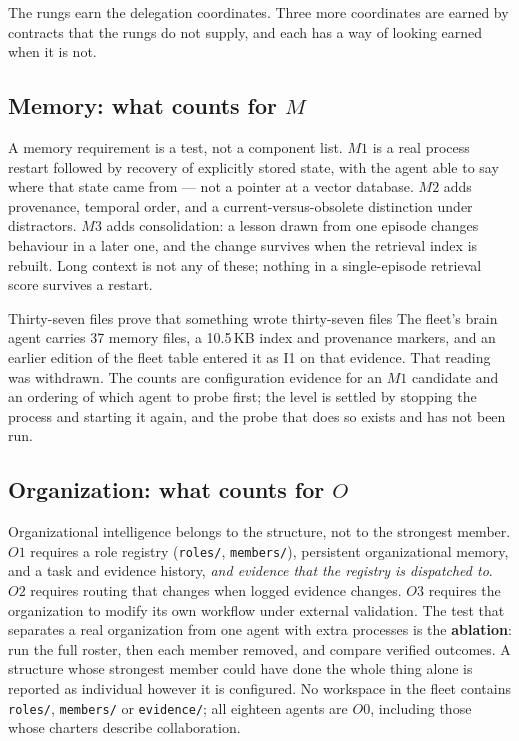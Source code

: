 \documentclass[11pt]{article}
\theoremstyle{definition}
\begin{document}
The rungs earn the delegation coordinates. Three more coordinates are earned by contracts that the rungs do not supply, and each has a way of looking earned when it is not.

\subsection{Memory: what counts for $M$}

A memory requirement is a test, not a component list. $M1$ is a real process restart followed by recovery of explicitly stored state, with the agent able to say where that state came from --- not a pointer at a vector database. $M2$ adds provenance, temporal order, and a current-versus-obsolete distinction under distractors. $M3$ adds consolidation: a lesson drawn from one episode changes behaviour in a later one, and the change survives when the retrieval index is rebuilt. Long context is not any of these; nothing in a single-episode retrieval score survives a restart.

\begin{cautionbox}{Thirty-seven files prove that something wrote thirty-seven files}
The fleet's brain agent carries 37 memory files, a 10.5\,KB index and provenance markers, and an earlier edition of the fleet table entered it as I1 on that evidence. That reading was withdrawn. The counts are configuration evidence for an $M1$ candidate and an ordering of which agent to probe first; the level is settled by stopping the process and starting it again, and the probe that does so exists and has not been run.
\end{cautionbox}

\subsection{Organization: what counts for $O$}

Organizational intelligence belongs to the structure, not to the strongest member. $O1$ requires a role registry (\texttt{roles/}, \texttt{members/}), persistent organizational memory, and a task and evidence history, \emph{and evidence that the registry is dispatched to}. $O2$ requires routing that changes when logged evidence changes. $O3$ requires the organization to modify its own workflow under external validation. The test that separates a real organization from one agent with extra processes is the \textbf{ablation}: run the full roster, then each member removed, and compare verified outcomes. A structure whose strongest member could have done the whole thing alone is reported as individual however it is configured. No workspace in the fleet contains \texttt{roles/}, \texttt{members/} or \texttt{evidence/}; all eighteen agents are $O0$, including those whose charters describe collaboration.
\end{document}

